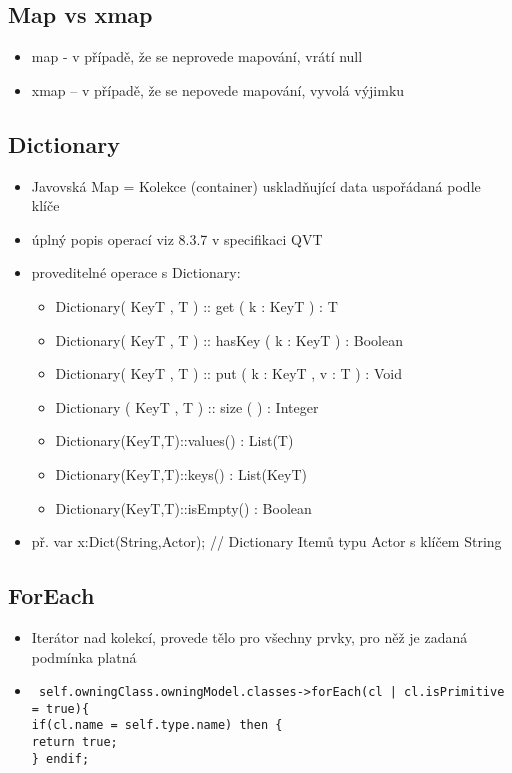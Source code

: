 \documentclass[11pt,a4paper]{article}   	%
\begin{document}
\subsection {Map vs xmap}
\begin{itemize}
  	\item	map - v případě, že se neprovede mapování, vrátí null
  	\item	xmap – v případě, že se nepovede mapování, vyvolá výjimku
\end{itemize}

\subsection{Dictionary}
\begin {itemize}
  	\item 	Javovská Map = Kolekce (container) uskladňující data uspořádaná
			podle klíče 
	\item	úplný popis operací viz 8.3.7 v specifikaci QVT
	\item 	proveditelné operace s Dictionary:\\
	 		\begin {itemize}
	 		  	\item 	Dictionary( KeyT , T ) :: get ( k : KeyT ) : T
				\item 	Dictionary( KeyT , T ) :: hasKey ( k : KeyT ) : Boolean
				\item 	Dictionary( KeyT , T ) :: put ( k : KeyT , v : T ) : Void
				\item 	Dictionary ( KeyT , T ) :: size ( ) : Integer
				\item	Dictionary(KeyT,T)::values() : List(T)
				\item	Dictionary(KeyT,T)::keys() : List(KeyT)
				\item	Dictionary(KeyT,T)::isEmpty() : Boolean
			\end{itemize}
	\item	př. var x:Dict(String,Actor); // Dictionary Itemů typu Actor s klíčem String
\end{itemize}

\subsection{ForEach}
\begin{itemize}
  	\item	Iterátor nad kolekcí, provede tělo pro všechny prvky, pro něž je
			zadaná podmínka platná
	\item	\texttt {
						self.owningClass.owningModel.classes->forEach(cl | cl.isPrimitive =
						true)\{\\ if(cl.name = self.type.name) then \{\\ return true; \\ \} endif;
			}
	 
\end{itemize}
\end{document}
